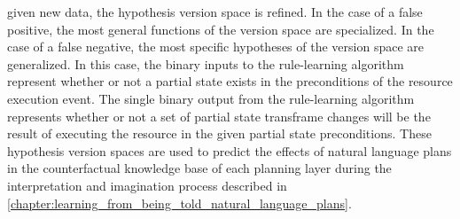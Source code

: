 given new data, the hypothesis version space is refined.  In the case
of a false positive, the most general functions of the version space
are specialized.  In the case of a false negative, the most specific
hypotheses of the version space are generalized.  In this case, the
binary inputs to the rule-learning algorithm represent whether or not
a partial state exists in the preconditions of the resource execution
event.  The single binary output from the rule-learning algorithm
represents whether or not a set of partial state transframe changes
will be the result of executing the resource in the given partial
state preconditions.  These hypothesis version spaces are used to
predict the effects of natural language plans in the counterfactual
knowledge base of each planning layer during the interpretation and
imagination process described in
{\mbox{\autoref{chapter:learning_from_being_told_natural_language_plans}}}.

